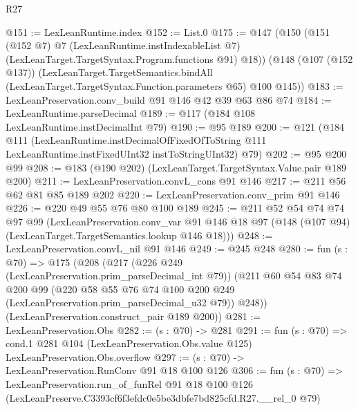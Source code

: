 \begin{lexlean}{R27}
\begin{coremodule}
@151 := LexLeanRuntime.index
@152 := List.{0}
@175 := @147
    (@150
      (@151
        (@152 @7)
        @7
        (LexLeanRuntime.instIndexableList @7)
        (LexLeanTarget.TargetSyntax.Program.functions @91)
        @18))
    (@148
      (@107 (@152 @137))
      (LexLeanTarget.TargetSemantics.bindAll
        (LexLeanTarget.TargetSyntax.Function.parameters @65)
        @100
        @145))
@183 := LexLeanPreservation.conv_build @91 @146 @42 @39 @63 @86 @74
@184 := LexLeanRuntime.parseDecimal
@189 := @117 (@184 @108 LexLeanRuntime.instDecimalInt @79)
@190 := @95 @189
@200 := @121
    (@184
      @111
      (LexLeanRuntime.instDecimalOfFixedOfToString
        @111
        LexLeanRuntime.instFixedUInt32
        instToStringUInt32)
      @79)
@202 := @95 @200 @99
@208 := @183 (@190 @202) (LexLeanTarget.TargetSyntax.Value.pair @189 @200)
@211 := LexLeanPreservation.convL_cons @91 @146
@217 := @211 @56 @62 @81 @85 @189 @202
@220 := LexLeanPreservation.conv_prim @91 @146
@226 := @220 @49 @55 @76 @80 @100 @189
@245 := @211
    @52
    @54
    @74
    @74
    @97
    @99
    (LexLeanPreservation.conv_var
      @91
      @146
      @18
      @97
      (@148 (@107 @94) (LexLeanTarget.TargetSemantics.lookup @146 @18)))
@248 := LexLeanPreservation.convL_nil @91 @146
@249 := @245 @248
@280 := fun (s : @70) =>
  @175
    (@208
      (@217
        (@226 @249 (LexLeanPreservation.prim_parseDecimal_int @79))
        (@211
          @60
          @54
          @83
          @74
          @200
          @99
          (@220 @58 @55 @76 @74 @100 @200 @249 (LexLeanPreservation.prim_parseDecimal_u32 @79))
          @248))
      (LexLeanPreservation.construct_pair @189 @200))
@281 := LexLeanPreservation.Obs
@282 := (s : @70) -> @281
@291 := fun (s : @70) =>
  cond.{1} @281 @104 (LexLeanPreservation.Obs.value @125) LexLeanPreservation.Obs.overflow
@297 := (s : @70) -> LexLeanPreservation.RunConv @91 @18 @100 @126
@306 := fun (s : @70) =>
  LexLeanPreservation.run_of_funRel
    @91
    @18
    @100
    @126
    (LexLeanPreserve.C3393cf6f3efdc0e5be3dbfe7bd825cfd.R27.__rel_0 @79)
\end{coremodule}
\end{lexlean}
